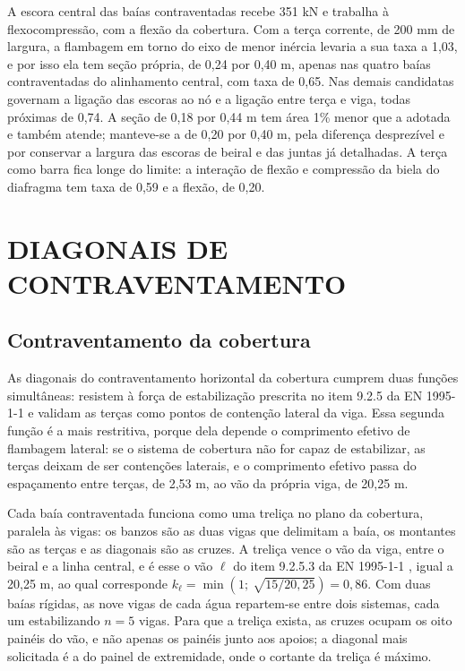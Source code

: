 A escora central das baías contraventadas recebe 351 kN e trabalha à
flexocompressão, com a flexão da cobertura. Com a terça corrente, de 200 mm de
largura, a flambagem em torno do eixo de menor inércia levaria a sua taxa a 1,03,
e por isso ela tem seção própria, de 0,24 por 0,40 m, apenas nas quatro baías
contraventadas do alinhamento central, com taxa de 0,65. Nas demais candidatas
governam a ligação das escoras ao nó e a ligação entre terça e viga, todas
próximas de 0,74. A seção de 0,18 por 0,44 m tem área 1\% menor que a adotada e
também atende; manteve-se a de 0,20 por 0,40 m, pela diferença desprezível e por
conservar a largura das escoras de beiral e das juntas já detalhadas. A terça
como barra fica longe do limite: a interação de flexão e compressão da biela do
diafragma tem taxa de 0,59 e a flexão, de 0,20.

\section{DIAGONAIS DE CONTRAVENTAMENTO}\label{sec:predim-contraventamento}

\subsection{Contraventamento da cobertura}\label{ssec:predim-cv-cobertura}

As diagonais do contraventamento horizontal da cobertura cumprem duas funções
simultâneas: resistem à força de estabilização prescrita no item 9.2.5 da
EN 1995-1-1 \cite{EN1995-1-1:2004} e validam as terças como pontos de contenção
lateral da viga. Essa segunda função é a mais restritiva, porque dela depende o
comprimento efetivo de flambagem lateral: se o sistema de cobertura não for
capaz de estabilizar, as terças deixam de ser contenções laterais, e o
comprimento efetivo passa do espaçamento entre terças, de 2,53 m, ao vão da
própria viga, de 20,25 m.

Cada baía contraventada funciona como uma treliça no plano da cobertura,
paralela às vigas: os banzos são as duas vigas que delimitam a baía, os
montantes são as terças e as diagonais são as cruzes. A treliça vence o vão da
viga, entre o beiral e a linha central, e é esse o vão $\ell$ do item 9.2.5.3
da EN 1995-1-1 \cite{EN1995-1-1:2004}, igual a 20,25 m, ao qual corresponde
$k_{\ell} = \min(1;\ \sqrt{15/20{,}25}) = 0{,}86$. Com duas baías rígidas, as
nove vigas de cada água repartem-se entre dois sistemas, cada um estabilizando
$n = 5$ vigas. Para que a treliça exista, as cruzes ocupam os oito painéis do
vão, e não apenas os painéis junto aos apoios; a diagonal mais solicitada é a
do painel de extremidade, onde o cortante da treliça é máximo.

